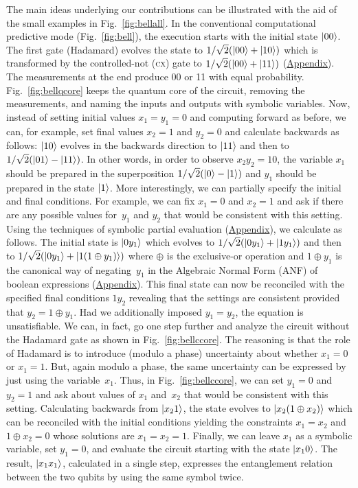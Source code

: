 \documentclass[aps,prl,twocolumn,superscriptaddress,floatfix,notitlepage]{revtex4-2}
\newcommand{\cx}{\textsc{cx}}
\begin{document}
The main ideas underlying our contributions can be illustrated with
the aid of the small examples in Fig.~\ref{fig:bellall}. In the
conventional computational predictive mode (Fig.~\ref{fig:bell}), the
execution starts with the initial state $\ket{00}$. The first gate
(Hadamard) evolves the state to $1/\sqrt{2}(\ket{00} + \ket{10})$
which is transformed by the controlled-not (\cx) gate to
$1/\sqrt{2}(\ket{00} + \ket{11})$
(\hyperref[sec:Methods]{Appendix}). The measurements at the end
produce 00 or 11 with equal probability. Fig.~\ref{fig:bellqcore}
keeps the quantum core of the circuit, removing the measurements, and
naming the inputs and outputs with symbolic variables. Now, instead of
setting initial values $x_1=y_1=0$ and computing forward as before, we
can, for example, set final values $x_2=1$ and $y_2=0$ and calculate
backwards as follows: $\ket{10}$ evolves in the backwards direction to
$\ket{11}$ and then to $1/\sqrt{2}(\ket{01}-\ket{11})$. In other
words, in order to observe $x_2y_2=10$, the variable $x_1$ should be
prepared in the superposition $1/\sqrt{2}(\ket{0}-\ket{1})$ and $y_1$
should be prepared in the state $\ket{1}$. More interestingly, we can
partially specify the initial and final conditions. For example, we
can fix $x_1=0$ and $x_2=1$ and ask if there are any possible values
for~$y_1$ and $y_2$ that would be consistent with this setting.  Using
the techniques of symbolic partial evaluation
(\hyperref[sec:Methods]{Appendix}), we calculate as follows. The
initial state is $\ket{0y_1}$ which evolves to
$1/\sqrt{2}(\ket{0y_1}+\ket{1y_1})$ and then to
$1/\sqrt{2}(\ket{0y_1}+\ket{1(1 \oplus y_1)})$ where $\oplus$ is the
exclusive-or operation and $1 \oplus y_1$ is the canonical way of
negating~$y_1$ in the Algebraic Normal Form (ANF) of boolean
expressions (\hyperref[sec:Methods]{Appendix}).  This final state can
now be reconciled with the specified final conditions $1y_2$ revealing
that the settings are consistent provided that $y_2 = 1 \oplus
y_1$. Had we additionally imposed $y_1=y_2$, the equation is
unsatisfiable. We can, in fact, go one step further and analyze the
circuit without the Hadamard gate as shown in
Fig.~\ref{fig:bellccore}. The reasoning is that the role of Hadamard
is to introduce (modulo a phase) uncertainty about whether $x_1=0$ or
$x_1=1$. But, again modulo a phase, the same uncertainty can be
expressed by just using the variable~$x_1$. Thus, in
Fig.~\ref{fig:bellccore}, we can set $y_1=0$ and $y_2=1$ and ask about
values of $x_1$ and~$x_2$ that would be consistent with this
setting. Calculating backwards from $\ket{x_21}$, the state evolves to
$\ket{x_2(1 \oplus x_2)}$ which can be reconciled with the initial
conditions yielding the constraints $x_1=x_2$ and $1 \oplus x_2 = 0$
whose solutions are $x_1 = x_2 = 1$. Finally, we can leave $x_1$ as a
symbolic variable, set $y_1=0$, and evaluate the circuit starting with
the state $\ket{x_10}$. The result, $\ket{x_1x_1}$, calculated in a
single step, expresses the entanglement relation between the two
qubits by using the same symbol twice.
\end{document}
